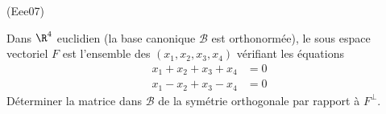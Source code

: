 \begin{tiny}(Eee07)\end{tiny}
Dans $\R^{4}$ euclidien (la base canonique $\mathcal{B}$ est orthonorm{\'e}e), le sous espace vectoriel $F$ est l'ensemble des $(x_{1},x_{2},x_{3},x_{4})$ v{\'e}rifiant les {\'e}quations
\begin{align*}
x_{1}+x_{2}+x_{3}+x_{4} &= 0 \\
x_{1}-x_{2}+x_{3}-x_{4} &= 0
\end{align*}
D{\'e}terminer la matrice dans $\mathcal{B}$ de la sym{\'e}trie orthogonale par rapport {\`a} $F^{\perp }$.